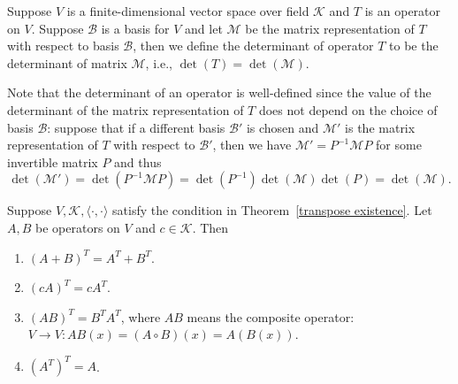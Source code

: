     \begin{definitionenv}
        Suppose $V$ is a finite-dimensional vector space over field $\mathcal{K}$ and $T$ is an operator on $V$. Suppose $\mathcal{B}$ is a basis for $V$ and let $\mathcal{M}$ be the matrix representation of $T$ with respect to basis $\mathcal{B}$, then we define the determinant of operator $T$ to be the determinant of matrix $\mathcal{M}$, i.e., $\det(T) = \det(\mathcal{M})$.
    \end{definitionenv}
    \begin{remarkenv}
        Note that the determinant of an operator is well-defined since the value of the determinant of the matrix representation of $T$ does not depend on the choice of basis $\mathcal{B}$: suppose that if a different basis $\mathcal{B}'$ is chosen and $\mathcal{M}'$ is the matrix representation of $T$ with respect to $\mathcal{B}'$, then we have $\mathcal{M}' = P^{-1} \mathcal{M} P$ for some invertible matrix $P$ and thus $$\det(\mathcal{M}') = \det(P^{-1} \mathcal{M} P) = \det(P^{-1}) \det(\mathcal{M}) \det(P) = \det(\mathcal{M}).$$
    \end{remarkenv}
    \begin{theoremenv}
        Suppose $V,\mathcal{K}, \langle \cdot, \cdot \rangle$ satisfy the condition in Theorem~\ref{transpose existence}. Let $A,B$ be operators on $V$ and $c\in \mathcal{K}$. Then
        \begin{enumerate}
            \item $(A+B)^T = A^T + B^T$.
            \item $(cA)^T = c A^T$.
            \item $(AB)^T = B^T A^T$, where $AB$ means the composite operator: $V\to V: AB(x) = (A\circ B)(x) = A(B(x))$.
            \item $(A^T)^T = A$.
        \end{enumerate}
    \end{theoremenv}
